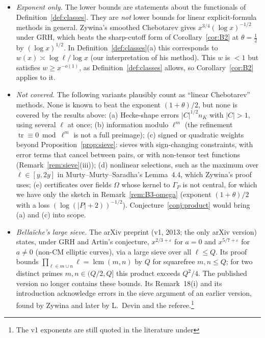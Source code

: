 \documentclass[11pt]{amsart}
\theoremstyle{definition}
\theoremstyle{remark}
\DeclareMathOperator{\tr}{tr}
\begin{document}
\begin{itemize}[leftmargin=*]
\item \emph{Exponent only.} The lower bounds are statements about the functionals of Definition~\ref{def:classes}.
  They are \emph{not} lower bounds for linear explicit-formula methods in general. Zywina's smoothed Chebotarev
  \cite[Thms.~2.2--2.3]{Zyw15} gives $x^{3/4}(\log x)^{-1/2}$ under GRH, which beats the sharp-cutoff form of
  Corollary~\ref{cor:B2} at $\theta=\frac12$ by $(\log x)^{1/2}$. In Definition~\ref{def:classes}(a) this corresponds
  to $w(x)\asymp\log\ell/\log x$ (our interpretation of his method). This $w$ is $<1$ but satisfies
  $w\ge x^{-o(1)}$, as Definition~\ref{def:classes} allows, so Corollary~\ref{cor:B2} applies to it.
\item \emph{Not covered.} The following variants plausibly count as ``linear Chebotarev'' methods. None is known to
  beat the exponent $(1+\theta)/2$, but none is covered by the results above:
  (a) Hecke-shape errors $|C|^{1/2}n_K$ with $|C|>1$, using several $\ell$ at once;
  (b) information modulo $\ell^m$ (the refinement $\tr\equiv0\bmod\ell^m$ is not a full preimage);
  (c) signed or quadratic weights beyond Proposition~\ref{prop:sieve}: sieves with sign-changing constraints, with
  error terms that cancel between pairs, or with non-tensor test functions (Remark~\ref{rem:sieve}(iii));
  (d) nonlinear selections, such as the maximum over $\ell\in[y,2y]$ in Murty--Murty--Saradha's Lemma~4.4, which
  Zywina's proof uses;
  (e) certificates over fields $\Omega$ whose kernel to $\Gamma_P$ is not central, for which we have only the
  sketch in Remark~\ref{rem:B3-omega} (exponent $(1+\theta)/2$ with a loss $(\log(|P|+2))^{-1/2}$).
  Conjecture~\ref{conj:product} would bring (a) and (c) into scope.
\item \emph{Bella\"iche's large sieve.} The arXiv preprint \cite{Bel13} (v1, 2013; the only arXiv version) states,
  under GRH and Artin's conjecture, $x^{2/3+\varepsilon}$ for $a=0$ and $x^{5/7+\varepsilon}$ for $a\ne0$ (non-CM
  elliptic curves), via a large sieve over all $\ell\le Q$. Its proof bounds
  $\prod_{\ell\in m\cup n}\ell=\operatorname{lcm}(m,n)$ by $Q$ for squarefree $m,n\le Q$; for two distinct primes
  $m,n\in(Q/2,Q]$ this product exceeds $Q^2/4$. The published version \cite{Bel16} no longer contains these bounds.
  Its Remark~18(i) and its introduction acknowledge errors in the sieve argument of an earlier version, found by
  Zywina and later by L.~Devin and the referee.\footnote{The v1 exponents are still quoted in the literature under
}
\end{itemize}
\end{document}
